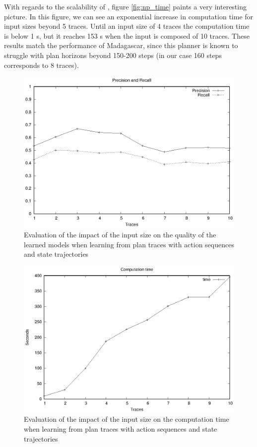 With regards to the scalability of \FAMA, figure \ref{fig:np_time} paints a very interesting picture. In this figure, we can see an exponential increase in computation time for input sizes beyond 5 traces. Until an input size of 4 traces the computation time is below 1 s, but it reaches 153 s when the input is composed of 10 traces. These results match the performance of {\sc Madagascar}, since this planner is known to struggle with plan horizons beyond 150-200 steps (in our case 160 steps corresponds to 8 traces).


\begin{figure}[hbt!]
	\centering
	\includegraphics[width=0.8\linewidth]{figures/input_size_0_0_precision.eps}
	\caption{Evaluation of the impact of the input size on the quality of the learned models when learning from plan traces with \NO action sequences and \NO state trajectories}
	\label{fig:pspace_quality}
\end{figure}

\begin{figure}[hbt!]
	\centering
	\includegraphics[width=0.8\linewidth]{figures/input_size_0_0_time.eps}
	\caption{Evaluation of the impact of the input size on the computation time when learning from plan traces with \NO action sequences and \NO state trajectories}
	\label{fig:pspace_time}
\end{figure}

